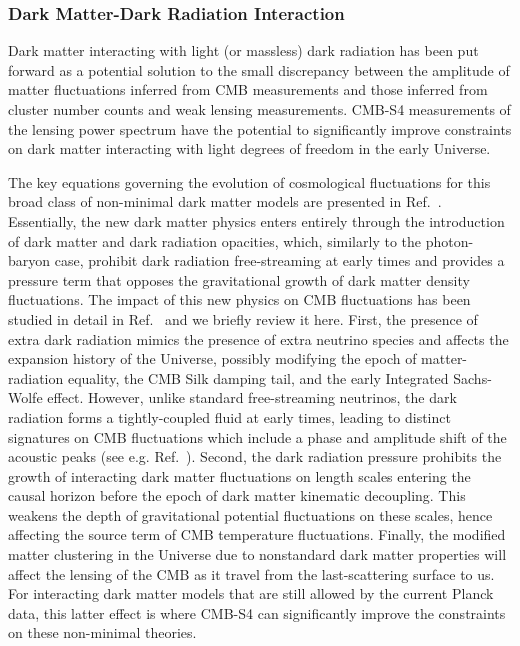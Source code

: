 \subsubsection{Dark Matter-Dark Radiation Interaction}
Dark matter interacting with light (or massless) dark radiation  has been put forward \cite{Buen-Abad:2015ova,Lesgourgues:2015wza} as a potential solution to the small discrepancy between the amplitude of matter fluctuations inferred from CMB measurements and those inferred from cluster number counts and weak lensing measurements. CMB-S4 measurements of the lensing power spectrum have the potential to significantly improve constraints on dark matter interacting with light degrees of freedom in the early Universe.

The key equations governing the evolution of cosmological fluctuations for this broad class of non-minimal dark matter models are presented in Ref.~\cite{Cyr-Racine:2015ihg}. Essentially, the new dark matter physics enters entirely through the introduction of dark matter and dark radiation opacities, which, similarly to the photon-baryon case, prohibit dark radiation free-streaming at early times and provides a pressure term that opposes the gravitational growth of dark matter density fluctuations. The impact of this new physics on CMB fluctuations has been studied in detail in Ref.~\cite{Cyr-Racine:2013fsa} and we briefly review it here. First, the presence of extra dark radiation mimics the presence of extra neutrino species and affects the expansion history of the Universe, possibly modifying the epoch of matter-radiation equality, the CMB Silk damping tail, and the early Integrated Sachs-Wolfe effect. However, unlike standard free-streaming neutrinos, the dark radiation forms a tightly-coupled fluid at early times, leading to distinct signatures on CMB fluctuations which include a phase and amplitude shift of the acoustic peaks (see e.g. Ref.~\cite{Bashinsky:2003tk,Cyr-Racine:2013jua,Follin:2015hya}). Second, the dark radiation pressure prohibits the growth of interacting dark matter fluctuations on length scales entering the causal horizon before the epoch of dark matter kinematic decoupling. This weakens the depth of gravitational potential fluctuations on these scales, hence affecting the source term of CMB temperature fluctuations. Finally, the modified matter clustering in the Universe due to nonstandard dark matter properties will affect the lensing of the CMB as it travel from the last-scattering surface to us. For interacting dark matter models that are still allowed by the current Planck data, this latter effect is where CMB-S4 can significantly improve the constraints on these non-minimal theories.

